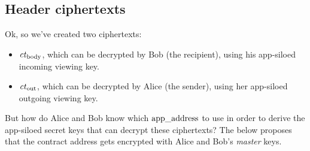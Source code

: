\subsection{Header ciphertexts}


Ok, so we've created two ciphertexts:
\begin{itemize}
    \item $\ctbody$, which can be decrypted by Bob (the recipient), using his app-siloed incoming viewing key.
    \item $\ctout$, which can be decrypted by Alice (the sender), using her app-siloed outgoing viewing key.
\end{itemize}
\noindent
But how do Alice and Bob know which $\appaddress$ to use in order to derive the app-siloed secret keys that can decrypt these ciphertexts?
The below proposes that the contract address gets encrypted with Alice and Bob's \textit{master} keys.
\\
\\

